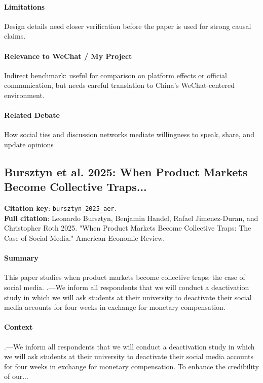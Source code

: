 \documentclass[12pt]{article}
\begin{document}
\paragraph{Limitations} Design details need closer verification before the paper is used for strong causal claims.

\paragraph{Relevance to WeChat / My Project} Indirect benchmark: useful for comparison on platform effects or official communication, but needs careful translation to China's WeChat-centered environment.

\paragraph{Related Debate} How social ties and discussion networks mediate willingness to speak, share, and update opinions


\subsection{Bursztyn et al. 2025: When Product Markets Become Collective Traps...}
\textbf{Citation key}: \texttt{bursztyn\_2025\_aer}.\\
\textbf{Full citation}: Leonardo Bursztyn, Benjamin Handel, Rafael Jimenez-Duran, and Christopher Roth 2025. "When Product Markets Become Collective Traps: The Case of Social Media." American Economic Review.

\paragraph{Summary} This paper studies when product markets become collective traps: the case of social media. .---We inform all respondents that we will conduct a deactivation study in which we will ask students at their university to deactivate their social media accounts for four weeks in exchange for monetary compensation.

\paragraph{Context} .---We inform all respondents that we will conduct a deactivation study in which we will ask students at their university to deactivate their social media accounts for four weeks in exchange for monetary compensation. To enhance the credibility of our...
\end{document}
